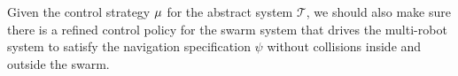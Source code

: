 \documentclass[letterpaper, 10 pt, conference]{ieeeconf}
\newtheorem{subproblem}{Sub-Problem}
\begin{document}


Given the control strategy $\mu$ for the abstract system $\mathcal{T}$, we should also make sure there is a refined control policy for the swarm system that drives the multi-robot system to satisfy the navigation specification $\psi$ without collisions inside and outside the swarm.




\end{document}
